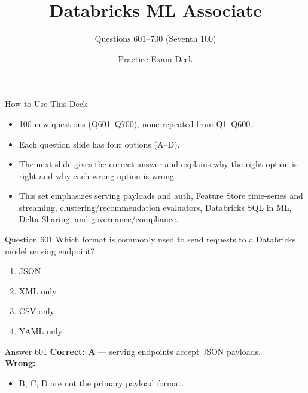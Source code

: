 \documentclass[aspectratio=169,11pt]{beamer}
\title{Databricks ML Associate}
\subtitle{Questions 601--700 (Seventh 100)}
\author{Practice Exam Deck}
\date{}
\begin{document}
	
	\begin{frame}
		\titlepage
	\end{frame}
	
	\begin{frame}{How to Use This Deck}
		\begin{itemize}
			\item 100 new questions (Q601--Q700), none repeated from Q1--Q600.
			\item Each question slide has four options (A--D).
			\item The next slide gives the correct answer and explains why the right option is right and why each wrong option is wrong.
			\item This set emphasizes serving payloads and auth, Feature Store time-series and streaming, clustering/recommendation evaluators, Databricks SQL in ML, Delta Sharing, and governance/compliance.
		\end{itemize}
	\end{frame}
	
	\begin{frame}{Question 601}
		Which format is commonly used to send requests to a Databricks model serving endpoint?
		\begin{enumerate}[label=\Alph*.]
			\item JSON
			\item XML only
			\item CSV only
			\item YAML only
		\end{enumerate}
	\end{frame}
	\begin{frame}{Answer 601}
		\textbf{Correct: A} --- serving endpoints accept JSON payloads.\\
		\vspace{0.5em}
		\textbf{Wrong:}
		\begin{itemize}
			\item B, C, D are not the primary payload format.
		\end{itemize}
	\end{frame}
	
\end{document}
